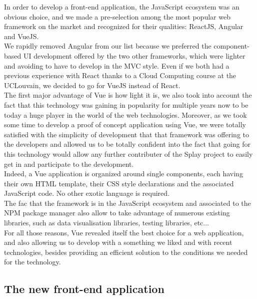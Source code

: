 \documentclass{eplmastersthesis}
\begin{document}
        In order to develop a front-end application, the JavaScript ecosystem
        was an obvious choice, and we made a pre-selection among the most
        popular web framework on the market and recognized for their qualities:
        ReactJS, Angular and VueJS.\\
        We rapidly removed Angular from our list because we preferred the
        component-based UI development offered by the two other frameworks,
        which were lighter and avoiding to have to develop in the MVC style.
        Even if we both had a previous experience with React thanks to a
        Cloud Computing course at the UCLouvain, we decided to go for VueJS
        instead of React.\\

        The first major advantage of Vue is how light it is, we also took into
        account the fact that this technology was gaining in popularity for
        multiple years now to be today a huge player in the world of the web
        technologies. Moreover, as we took some time to develop a proof
        of concept application using Vue, we were totally satisfied with the
        simplicity of development that that framework was offering to the
        developers and allowed us to be totally confident into the fact
        that going for this technology would allow any further contributer
        of the Splay project to easily get in and participate to the
        development.\\
        Indeed, a Vue application is organized around single components, each
        having their own HTML template, their CSS style declarations and
        the associated JavaScript code. No other exotic language is required.\\
        The fac that the framework is in the JavaScript ecosystem and
        associated to the NPM package manager also allow to take advantage of
        numerous existing libraries, such as data visualisation libraries,
        testing libraries, etc... \\

        For all those reasons, Vue revealed itself the best choice for a
        web application, and also allowing us to develop with a something
        we liked and with recent technologies, besides providing an efficient
        solution to the conditions we needed for the technology.

      \subsection{The new front-end application} 
\end{document}
